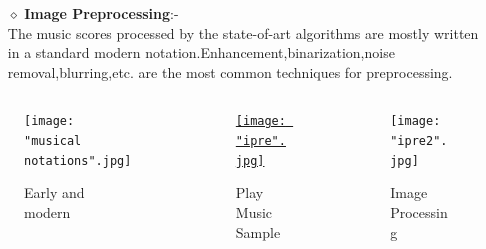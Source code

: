 \documentclass{beamer}
\begin{document}
\begin{frame}
\transboxin

\begin{itemize}
\item[$\diamond$]{\textbf {Image Preprocessing}:-}\\ \pause
The music scores processed by the state-of-art algorithms are mostly written in a standard modern notation.Enhancement,binarization,noise removal,blurring,etc. are the most common techniques for preprocessing.\pause
\end{itemize}
\begin{columns}
\begin{column}{0.4\textwidth}
\begin{figure}
    \texttt{[image: "musical notations".jpg]}
    \caption{Early and modern}\pause
\end{figure}
\end{column}
\begin{column}{0.42\textwidth}
\begin{figure}
\href{run:riu.mp3}{\texttt{[image: "ipre".jpg]}}


    \caption{Play Music Sample}\pause
\end{figure}
\end{column}
\begin{column}{0.38\textwidth}
\begin{figure}
    \texttt{[image: "ipre2".jpg]}
    \caption{Image Processing}\pause
\end{figure}
\end{column}
\end{columns}

\end{frame}
\end{document}
